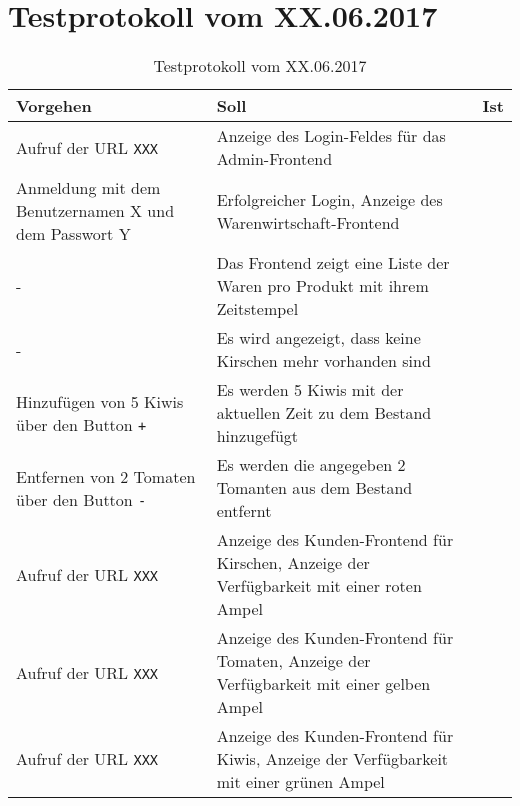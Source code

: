 \section{Testprotokoll vom XX.06.2017}
\label{sec: Testprotokoll vom XX.06.2017}

\begin{table}[H]
\begin{small}
	\begin{center}
  	\caption{Testprotokoll vom XX.06.2017}
   	\renewcommand{\arraystretch}{1.0}
    \begin{tabularx}{\textwidth}{|X|X|L{1cm}|}	
    \hline
    				
    \textbf{Vorgehen} & \textbf{Soll} & \textbf{Ist} \\ \hline
    
    Aufruf der URL \texttt{XXX} & 
    Anzeige des Login-Feldes für das Admin-Frontend &
     \\ \hline
    
    Anmeldung mit dem Benutzernamen X und dem Passwort Y & 
    Erfolgreicher Login, Anzeige des Warenwirtschaft-Frontend &
     \\ \hline
    
    - & 
    Das Frontend zeigt eine Liste der Waren pro Produkt mit ihrem Zeitstempel &
     \\ \hline
     
     - &
     Es wird angezeigt, dass keine Kirschen mehr vorhanden sind & 
    \\ \hline
    
    Hinzufügen von 5 Kiwis über den Button \texttt{+} &
    Es werden 5 Kiwis mit der aktuellen Zeit zu dem Bestand hinzugefügt &
    \\ \hline
    
    Entfernen von 2 Tomaten über den Button \texttt{-} &
    Es werden die angegeben 2 Tomanten aus dem Bestand entfernt & 
    \\ \hline
    
    Aufruf der URL \texttt{XXX} &
    Anzeige des Kunden-Frontend für Kirschen,
    Anzeige der Verfügbarkeit mit einer roten Ampel &
    \\ \hline
    
    Aufruf der URL \texttt{XXX} &
    Anzeige des Kunden-Frontend für Tomaten,
    Anzeige der Verfügbarkeit mit einer gelben Ampel &
	\\ \hline
    
    Aufruf der URL \texttt{XXX} &
    Anzeige des Kunden-Frontend für Kiwis,
    Anzeige der Verfügbarkeit mit einer grünen Ampel &
	\\ \hline
	

\end{tabularx}
\end{center}
\end{small}
\end{table}

